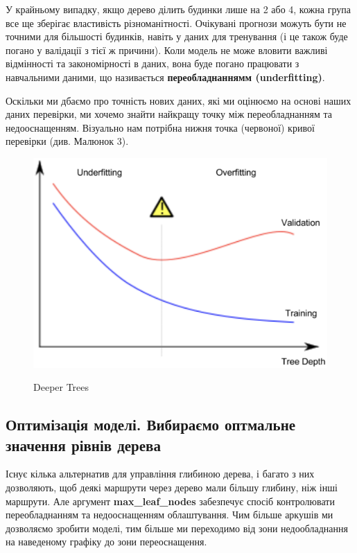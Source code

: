 \documentclass[11pt]{article}
\begin{document}
    У крайньому випадку, якщо дерево ділить будинки лише на 2 або 4, кожна група все ще зберігає властивість різноманітності.
    Очікувані прогнози можуть бути не точними для більшості будинків, навіть у даних для тренування (і це також буде погано у валідації з тієї ж причини).
    Коли модель не може вловити важливі відмінності та закономірності в даних, вона буде погано працювати з навчальними даними, що називається \textbf{переобладнаннямм (underfitting)}.

    Оскільки ми дбаємо про точність нових даних, які ми оцінюємо на основі наших даних перевірки, ми хочемо знайти найкращу точку між переобладнанням та недооснащенням.
    Візуально нам потрібна нижня точка (червоної) кривої перевірки (див. Малюнок 3).

    \begin{figure}
        \label{fig:image3}
        \centering
        \includegraphics[scale=0.5]{image3.png}

        Deeper Trees
    \end{figure}

    \subsection{Оптимізація моделі. Вибираємо оптмальне значення рівнів дерева}\label{subsec:selecting_number_of_leafs}
    Існує кілька альтернатив для управління глибиною дерева, і багато з них дозволяють, щоб деякі маршрути через дерево мали більшу глибину, ніж інші маршрути.
    Але аргумент \textbf{max\_leaf\_nodes} забезпечує спосіб контролювати переобладнанням та недооснащенням облаштування. Чим більше аркушів ми дозволяємо зробити моделі, тим більше ми переходимо від зони недообладнання на наведеному графіку до зони переоснащення.
\end{document}

